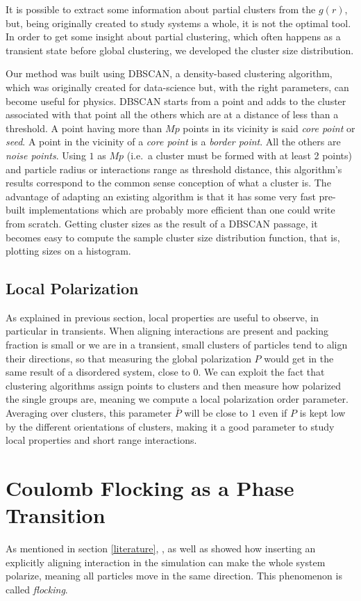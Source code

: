 \documentclass[../../master_thesis_np.tex]{subfiles}
\begin{document}
		It is possible to extract some information about partial clusters from the $g(r)$, but, being originally created to study systems a whole, it is not the optimal tool. 
		In order to get some insight about partial clustering, which often happens as a transient state before global clustering, we developed the cluster size distribution. 
		
		Our method was built using DBSCAN, a density-based clustering algorithm, which was originally created for data-science but, with the right parameters, can become useful for physics. 
		DBSCAN starts from a point and adds to the cluster associated with that point all the others which are at a distance of less than a threshold. 
		A point having more than $Mp$ points in its vicinity is said \emph{core point} or \emph{seed}. 
		A point in the vicinity of a \emph{core point} is a \emph{border point}. 
		All the others are \emph{noise points}. 
		Using $1$ as $Mp$ (i.e.\ a cluster must be formed with at least 2 points) and particle radius or interactions range as threshold distance, this algorithm's results correspond to the common sense conception of what a cluster is. 
		The advantage of adapting an existing algorithm is that it has some very fast pre-built implementations which are probably more efficient than one could write from scratch.
		Getting cluster sizes as the result of a DBSCAN passage, it becomes easy to compute the sample cluster size distribution function, that is, plotting sizes on a histogram.
		\subsection{Local Polarization}
		As explained in previous section, local properties are useful to observe, in particular in transients. 
		When aligning interactions are present and packing fraction is small or we are in a transient, small clusters of particles tend to align their directions, so that measuring the global polarization $P$ would get in the same result of a disordered system, close to $0$. 
		We can exploit the fact that clustering algorithms assign points to clusters and then measure how polarized the single groups are, meaning we compute a local polarization order parameter. 
		Averaging over clusters, this parameter $\bar{P}$ will be close to $1$ even if $P$ is kept low by the different orientations of clusters, making it a good parameter to study local properties and short range interactions.
		
		\section{Coulomb Flocking as a Phase Transition}
		As mentioned in section \ref{literature}, \citeauthor{martin-gomez_collective_2018}, as well as \citeauthor{negi_emergent_2022} showed how inserting an explicitly aligning interaction in the simulation can make the whole system polarize, meaning all particles move in the same direction. 
		This phenomenon is called \emph{flocking}.
		
\end{document}
